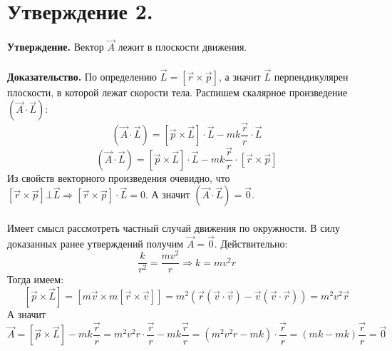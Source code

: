 \documentclass[a4paper,12pt]{article}
\begin{document}
\section*{Утверждение 2.}
\textbf{Утверждение.} Вектор $\vec{A}$ лежит в плоскости движения.
\\\\
\textbf{Доказательство.}
По определению $\vec{L} = \left[ \vec{r} \times \vec{p}\right] $, а значит $\vec{L}$ перпендикулярен плоскости, в которой лежат скорости тела. Распишем скалярное произведение $\left( \vec{A}\cdot\vec{L}\right)$:
\[\left( \vec{A}\cdot\vec{L}\right) =  \left[\vec{p}\times \vec{L} \right]\cdot\vec{L} - mk\frac{\vec{r}}{r}\cdot\vec{L} \]
\[\left( \vec{A}\cdot\vec{L}\right) =  \left[\vec{p}\times \vec{L} \right]\cdot\vec{L} - mk\frac{\vec{r}}{r}\cdot\left[ \vec{r} \times \vec{p}\right] \]
Из свойств векторного произведения очевидно, что $\left[ \vec{r} \times \vec{p}\right] \bot \vec{L} \Rightarrow \left[ \vec{r} \times \vec{p}\right] \cdot\vec{L} = 0$. А значит $\left( \vec{A}\cdot\vec{L}\right) =  \vec{0}$.
\\\\
Имеет смысл рассмотреть частный случай движения по окружности. В силу доказанных ранее утверждений получим $\vec{A} = \vec{0}$. Действительно:
\[ \frac{k}{r^2} = \frac{mv^2}{r} \Rightarrow k = mv^2r\]
Тогда имеем:
\[\left[\vec{p}\times\vec{L} \right] = \left[m\vec{v} \times m\left[\vec{r} \times\vec{v} \right] \right] = m^2(\vec{r}(\vec{v}\cdot\vec{v}) - \vec{v}(\vec{v}\cdot\vec{r})) = m^2v^2\vec{r}\]
А значит
\[\vec{A} = \left[\vec{p} \times \vec{L} \right] - mk\frac{\vec{r}}{r} = m^2v^2r\cdot\frac{\vec{r}}{r} - mk\frac{\vec{r}}{r} = (m^2v^2r - mk)\cdot\frac{\vec{r}}{r} = (mk - mk)\frac{\vec{r}}{r} = \vec{0}\] 
\end{document}
